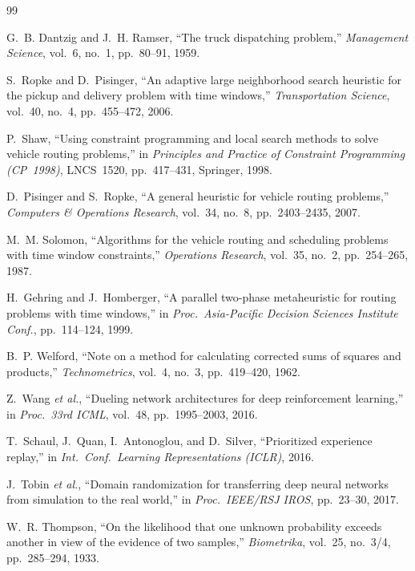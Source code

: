 \documentclass[journal]{IEEEtran}
\begin{document}
\begin{thebibliography}{99}

G.~B. Dantzig and J.~H. Ramser,
``The truck dispatching problem,''
\textit{Management Science}, vol.~6, no.~1, pp.~80--91, 1959.

S.~Ropke and D.~Pisinger,
``An adaptive large neighborhood search heuristic for the pickup and delivery
  problem with time windows,''
\textit{Transportation Science}, vol.~40, no.~4, pp.~455--472, 2006.

P.~Shaw,
``Using constraint programming and local search methods to solve vehicle routing
  problems,''
in \textit{Principles and Practice of Constraint Programming (CP~1998)},
LNCS~1520, pp.~417--431, Springer, 1998.

D.~Pisinger and S.~Ropke,
``A general heuristic for vehicle routing problems,''
\textit{Computers \& Operations Research}, vol.~34, no.~8,
pp.~2403--2435, 2007.

M.~M. Solomon,
``Algorithms for the vehicle routing and scheduling problems with time window
  constraints,''
\textit{Operations Research}, vol.~35, no.~2, pp.~254--265, 1987.

H.~Gehring and J.~Homberger,
``A parallel two-phase metaheuristic for routing problems with time windows,''
in \textit{Proc.\ Asia-Pacific Decision Sciences Institute Conf.},
pp.~114--124, 1999.

B.~P. Welford,
``Note on a method for calculating corrected sums of squares and products,''
\textit{Technometrics}, vol.~4, no.~3, pp.~419--420, 1962.

Z.~Wang \textit{et al.},
``Dueling network architectures for deep reinforcement learning,''
in \textit{Proc.\ 33rd ICML}, vol.~48, pp.~1995--2003, 2016.

T.~Schaul, J.~Quan, I.~Antonoglou, and D.~Silver,
``Prioritized experience replay,''
in \textit{Int.\ Conf.\ Learning Representations (ICLR)}, 2016.

J.~Tobin \textit{et al.},
``Domain randomization for transferring deep neural networks from simulation to
  the real world,''
in \textit{Proc.\ IEEE/RSJ IROS}, pp.~23--30, 2017.

W.~R. Thompson,
``On the likelihood that one unknown probability exceeds another in view of the
  evidence of two samples,''
\textit{Biometrika}, vol.~25, no.~3/4, pp.~285--294, 1933.


\end{thebibliography}
\end{document}

